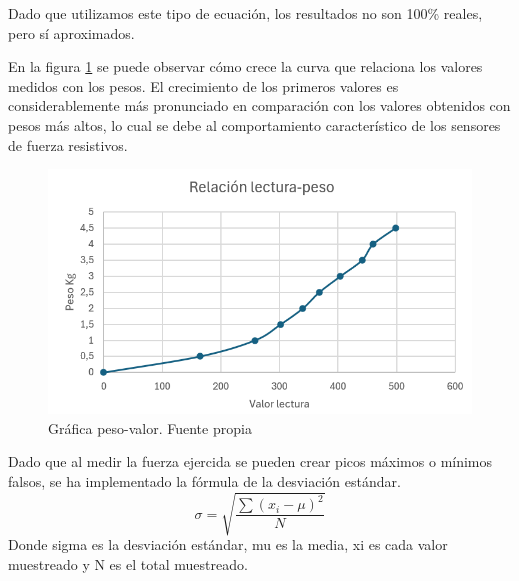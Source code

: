 Dado que utilizamos este tipo de ecuación, los resultados no son 100\% reales, pero sí aproximados.

En la figura \ref{fig:Grafica peso-valor} se puede observar cómo crece la curva que relaciona los valores medidos con los pesos. El crecimiento de los primeros valores es considerablemente más pronunciado en comparación con los valores obtenidos con pesos más altos, lo cual se debe al comportamiento característico de los sensores de fuerza resistivos. 
\begin{figure}
    \centering
    \includegraphics[width=0.75\linewidth]{img/Grafica peso-valor.png}
    \caption{Gráfica peso-valor. Fuente propia}
    \label{fig:Grafica peso-valor}
\end{figure}

Dado que al medir la fuerza ejercida se pueden crear picos máximos o mínimos falsos, se ha implementado la fórmula de la desviación estándar.
\begin{equation}
    \sigma=\sqrt{\frac{\sum\left(x_{i}-\mu\right)^{2}}{N}}
\end{equation}
Donde sigma es la desviación estándar, mu es la media, xi es cada valor muestreado y N es el total muestreado.